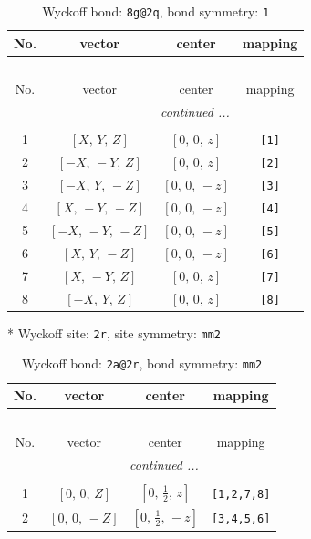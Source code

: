 \documentclass[fleqn,8pt]{jsarticle}
\begin{document}
\begin{longtable}{cccc}
\caption{Wyckoff bond: {\tt 8g@2q}, bond symmetry: {\tt 1}}
 \\
 \hline \hline
No. & vector & center & mapping \\ \hline \endfirsthead

\multicolumn{3}{l}{\tablename\ \thetable{}} \\
 \hline \hline
No. & vector & center & mapping \\ \hline \endhead

 \hline \hline
\multicolumn{3}{r}{\footnotesize\it continued ...} \\ \endfoot

 \hline \hline
\multicolumn{3}{r}{} \\ \endlastfoot

1 & $\left[ X,\, Y,\, Z \right]$ & $\left[ 0,\, 0,\, z \right]$ & {\tt [1]} \\ \hline
2 & $\left[ - X,\, - Y,\, Z \right]$ & $\left[ 0,\, 0,\, z \right]$ & {\tt [2]} \\ \hline
3 & $\left[ - X,\, Y,\, - Z \right]$ & $\left[ 0,\, 0,\, - z \right]$ & {\tt [3]} \\ \hline
4 & $\left[ X,\, - Y,\, - Z \right]$ & $\left[ 0,\, 0,\, - z \right]$ & {\tt [4]} \\ \hline
5 & $\left[ - X,\, - Y,\, - Z \right]$ & $\left[ 0,\, 0,\, - z \right]$ & {\tt [5]} \\ \hline
6 & $\left[ X,\, Y,\, - Z \right]$ & $\left[ 0,\, 0,\, - z \right]$ & {\tt [6]} \\ \hline
7 & $\left[ X,\, - Y,\, Z \right]$ & $\left[ 0,\, 0,\, z \right]$ & {\tt [7]} \\ \hline
8 & $\left[ - X,\, Y,\, Z \right]$ & $\left[ 0,\, 0,\, z \right]$ & {\tt [8]} \\
\end{longtable}
* Wyckoff site: {\tt 2r}, site symmetry: {\tt mm2}
\renewcommand{\arraystretch}{1.2}
\begin{longtable}{cccc}
\caption{Wyckoff bond: {\tt 2a@2r}, bond symmetry: {\tt mm2}}
 \\
 \hline \hline
No. & vector & center & mapping \\ \hline \endfirsthead

\multicolumn{3}{l}{\tablename\ \thetable{}} \\
 \hline \hline
No. & vector & center & mapping \\ \hline \endhead

 \hline \hline
\multicolumn{3}{r}{\footnotesize\it continued ...} \\ \endfoot

 \hline \hline
\multicolumn{3}{r}{} \\ \endlastfoot

1 & $\left[ 0,\, 0,\, Z \right]$ & $\left[ 0,\, \frac{1}{2},\, z \right]$ & {\tt [1,2,7,8]} \\ \hline
2 & $\left[ 0,\, 0,\, - Z \right]$ & $\left[ 0,\, \frac{1}{2},\, - z \right]$ & {\tt [3,4,5,6]} \\
\end{longtable}
\end{document}
